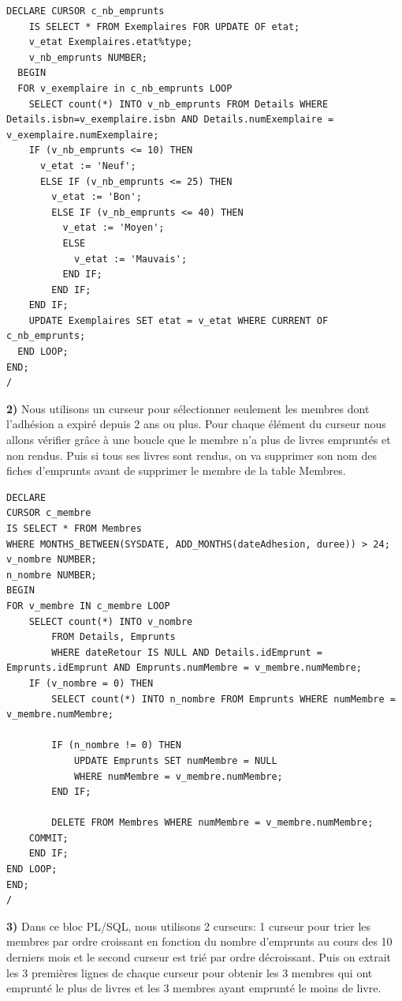 \documentclass[a4paper,12pt]{article}
\begin{document}
        \begin{lstlisting}
DECLARE CURSOR c_nb_emprunts
    IS SELECT * FROM Exemplaires FOR UPDATE OF etat;
    v_etat Exemplaires.etat%type;
    v_nb_emprunts NUMBER;
  BEGIN 
  FOR v_exemplaire in c_nb_emprunts LOOP
    SELECT count(*) INTO v_nb_emprunts FROM Details WHERE Details.isbn=v_exemplaire.isbn AND Details.numExemplaire = v_exemplaire.numExemplaire;
    IF (v_nb_emprunts <= 10) THEN
      v_etat := 'Neuf';   
      ELSE IF (v_nb_emprunts <= 25) THEN
        v_etat := 'Bon';
        ELSE IF (v_nb_emprunts <= 40) THEN
          v_etat := 'Moyen';
          ELSE
            v_etat := 'Mauvais';
          END IF;
        END IF;
    END IF;
    UPDATE Exemplaires SET etat = v_etat WHERE CURRENT OF c_nb_emprunts;
  END LOOP;
END;
/        
        \end{lstlisting}  
        \textbf {2)} Nous utilisons un curseur pour sélectionner seulement les membres dont l'adhésion a expiré depuis 2 ans ou plus. Pour chaque élément du curseur nous allons vérifier grâce à une boucle que le membre n'a plus de livres empruntés et non rendus. Puis si tous ses livres sont rendus, on va supprimer son nom des fiches d'emprunts avant de supprimer le membre de la table Membres.
        \begin{lstlisting}  
DECLARE
CURSOR c_membre 
IS SELECT * FROM Membres
WHERE MONTHS_BETWEEN(SYSDATE, ADD_MONTHS(dateAdhesion, duree)) > 24;
v_nombre NUMBER;
n_nombre NUMBER;
BEGIN	
FOR v_membre IN c_membre LOOP
	SELECT count(*) INTO v_nombre
		FROM Details, Emprunts
		WHERE dateRetour IS NULL AND Details.idEmprunt = Emprunts.idEmprunt AND Emprunts.numMembre = v_membre.numMembre;
	IF (v_nombre = 0) THEN
		SELECT count(*) INTO n_nombre FROM Emprunts WHERE numMembre = v_membre.numMembre;

		IF (n_nombre != 0) THEN
			UPDATE Emprunts SET numMembre = NULL
			WHERE numMembre = v_membre.numMembre;
		END IF;
			
		DELETE FROM Membres WHERE numMembre = v_membre.numMembre;
	COMMIT;
	END IF;
END LOOP;
END;
/
\end{lstlisting}         


      \textbf {3)} Dans ce bloc PL/SQL, nous utilisons 2 curseurs: 1 curseur pour trier les membres par ordre croissant en fonction du nombre d'emprunts au cours des 10 derniers mois et le second curseur est trié par ordre décroissant. Puis on extrait les 3 premières lignes de chaque curseur pour obtenir les 3 membres qui ont emprunté le plus de livres et les 3 membres ayant emprunté le moins de livre.
      
\end{document}
